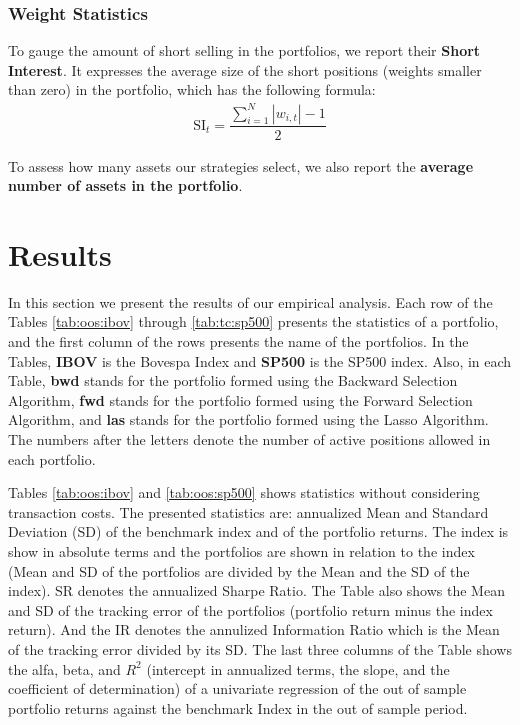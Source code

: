 \documentclass[preprint, doubleblind, authoryear,10pt]{elsarticle}
\begin{document}
\subsubsection*{Weight Statistics}

To gauge the amount of short selling in the portfolios, we report their \textbf{Short Interest}.
It expresses the average size of the short positions (weights smaller than zero) in the portfolio, which has the following formula:
\begin{align}
	\text{SI}_{t} = \dfrac{\sum_{i=1}^{N} |w_{i,t}| - 1}{2}
\end{align}

To assess how many assets our strategies select, we also report the \textbf{average number of assets in the portfolio}.

\section{Results} \label{sec:results}

In this section we present the results of our empirical analysis.
Each row of the Tables \ref{tab:oos:ibov} through \ref{tab:tc:sp500} presents the statistics of a portfolio, and the first column of the rows presents the name of the portfolios.
In the Tables, \textbf{IBOV} is the Bovespa Index and \textbf{SP500} is the SP500 index. 
Also, in each Table,
\textbf{bwd} stands for the portfolio formed using the Backward Selection Algorithm, 
\textbf{fwd} stands for the portfolio formed using the Forward Selection Algorithm, and
\textbf{las} stands for the portfolio formed using the Lasso Algorithm.
The numbers after the letters denote the number of active positions allowed in each portfolio.


Tables \ref{tab:oos:ibov} and \ref{tab:oos:sp500} shows statistics without considering transaction costs.
The presented statistics are: annualized Mean and Standard Deviation (SD) of the benchmark index and of the portfolio returns.
The index is show in absolute terms and the portfolios are shown in relation to the index (Mean and SD of the portfolios are divided by the Mean and the SD of the index).
SR denotes the annualized Sharpe Ratio.
The Table also shows the Mean and SD of the tracking error of the portfolios (portfolio return minus the index return).
And the IR denotes the annulized Information Ratio which is the Mean of the tracking error divided by its SD.
The last three columns of the Table shows the alfa, beta, and $R^2$ (intercept in annualized terms, the slope, and the coefficient of determination) of a univariate regression of the out of sample portfolio returns against the benchmark Index in the out of sample period.
\end{document}

